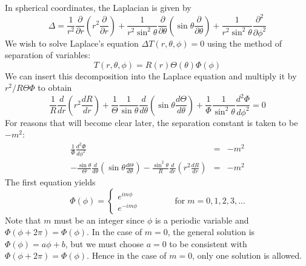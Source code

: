 \newpage
In spherical coordinates, the Laplacian is given by
\[
\Delta = 
\frac{1}{r^2} \frac{\partial }{\partial r} \left( r^2 \frac{\partial }{\partial r} \right)
+
\frac{1}{r^2 \sin^2 \theta} \frac{\partial}{\partial \theta} \left( \sin\theta \frac{\partial }{\partial \theta} \right)
+
\frac{1}{r^2 \sin^2 \theta} \frac{\partial^2}{\partial \phi^2}
\]
We wish to solve Laplace's equation $\Delta T(r,\theta,\phi)=0$ using the method 
of separation of variables:
\[
T(r,\theta,\phi) = R(r) \Theta(\theta) \Phi(\phi)
\]
We can insert this decomposition into the Laplace equation and multiply it by $r^2/R\Theta\Phi$ to obtain
\[
\frac{1}{R} \frac{d}{dr} \left( r^2 \frac{dR}{dr} \right) 
+ 
\frac{1}{\Theta} \frac{1}{\sin \theta} \frac{d}{d\theta} \left( \sin \theta \frac{d\Theta}{d\theta} \right)
+
\frac{1}{\Phi} \frac{1}{\sin^2 \theta} \frac{d^2\Phi}{d\phi^2}
=
0
\]
For reasons that will become clear later, the separation constant  is taken to be $-m^2$:
\begin{eqnarray}
\frac{1}{\Phi} \frac{d^2\Phi}{d\phi^2} &=& -m^2  \\
-\frac{\sin\theta}{\Theta} \frac{d}{d\theta} \left( \sin \theta \frac{d\Theta}{d\theta} \right)
- \frac{\sin^2\theta}{R} \frac{d}{dr} \left( r^2 \frac{dR}{dr} \right) &=& -m^2  \label{eq:spha2}
\end{eqnarray}
The first equation yields
\[
\Phi(\phi) = 
\left\{
\begin{array}{c}
e^{im\phi} \\ e^{-im\phi}
\end{array}
\right.
\qquad\qquad 
\text{for} \; m=0,1,2,3,...
\]
Note that $m$ must be an integer since $\phi$ is a periodic variable and $\Phi(\phi + 2\pi) = \Phi(\phi)$. 
In the case of $m=0$, the general solution is $\Phi(\phi) = a\phi + b$, but we must choose $a=0$ to
be consistent with $\Phi(\phi + 2\pi) = \Phi(\phi)$. Hence in the case of $m = 0$, only one solution is
allowed.

